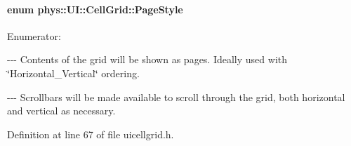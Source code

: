 \hypertarget{classphys_1_1UI_1_1CellGrid_a3644cef16e10c867c233105aae7b4e75}{
\paragraph[{PageStyle}]{\setlength{\rightskip}{0pt plus 5cm}enum {\bf phys::UI::CellGrid::PageStyle}}\hfill}
\label{classphys_1_1UI_1_1CellGrid_a3644cef16e10c867c233105aae7b4e75}
\begin{Desc}
\item[Enumerator: ]\par
\begin{description}
\item[{\em 
\hypertarget{classphys_1_1UI_1_1CellGrid_a3644cef16e10c867c233105aae7b4e75a5cc13206330cf9ed55fb443ff4600c77}{
CG\_\-Paged}
\label{classphys_1_1UI_1_1CellGrid_a3644cef16e10c867c233105aae7b4e75a5cc13206330cf9ed55fb443ff4600c77}
}]-\/-\/-\/ Contents of the grid will be shown as pages. Ideally used with \char`\"{}Horizontal\_\-Vertical\char`\"{} ordering. \item[{\em 
\hypertarget{classphys_1_1UI_1_1CellGrid_a3644cef16e10c867c233105aae7b4e75add8259b571786b4e1976dcdb97a8e9c6}{
CG\_\-Scrolled}
\label{classphys_1_1UI_1_1CellGrid_a3644cef16e10c867c233105aae7b4e75add8259b571786b4e1976dcdb97a8e9c6}
}]-\/-\/-\/ Scrollbars will be made available to scroll through the grid, both horizontal and vertical as necessary. \end{description}
\end{Desc}



Definition at line 67 of file uicellgrid.h.



